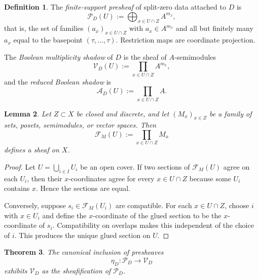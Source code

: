 \documentclass[11pt,a4paper]{article}
\numberwithin{equation}{section}
\newtheorem{theorem}{Theorem}[section]
\newtheorem{lemma}[theorem]{Lemma}
\theoremstyle{definition}
\newtheorem{definition}[theorem]{Definition}
\theoremstyle{remark}
\newcommand{\cP}{\mathcal P}
\newcommand{\cV}{\mathcal V}
\newcommand{\cA}{\mathcal A}
\newcommand{\taup}{\tau}
\begin{document}
\begin{definition}
The \emph{finite-support presheaf} of split-zero data attached to $D$ is
\[
\cP_D(U):=\bigoplus_{x\in U\cap Z}A^{m_x},
\]
that is, the set of families $(a_x)_{x\in U\cap Z}$ with $a_x\in A^{m_x}$ and all but finitely many $a_x$ equal to the basepoint $(\taup,\dots,\taup)$.  Restriction maps are coordinate projection.

The \emph{Boolean multiplicity shadow} of $D$ is the sheaf of $A$-semimodules
\[
\cV_D(U):=\prod_{x\in U\cap Z}A^{m_x},
\]
and the \emph{reduced Boolean shadow} is
\[
\cA_D(U):=\prod_{x\in U\cap Z}A.
\]
\end{definition}

\begin{lemma}\label{lem:product-sheaf}
Let $Z\subset X$ be closed and discrete, and let $(M_x)_{x\in Z}$ be a family of sets, posets, semimodules, or vector spaces.  Then
\[
\mathcal F_M(U):=\prod_{x\in U\cap Z}M_x
\]
defines a sheaf on $X$.
\end{lemma}

\begin{proof}
Let $U=\bigcup_{i\in I}U_i$ be an open cover.  If two sections of $\mathcal F_M(U)$ agree on each $U_i$, then their $x$-coordinates agree for every $x\in U\cap Z$ because some $U_i$ contains $x$.  Hence the sections are equal.

Conversely, suppose $s_i\in\mathcal F_M(U_i)$ are compatible.  For each $x\in U\cap Z$, choose $i$ with $x\in U_i$ and define the $x$-coordinate of the glued section to be the $x$-coordinate of $s_i$.  Compatibility on overlaps makes this independent of the choice of $i$.  This produces the unique glued section on $U$.
\end{proof}

\begin{theorem}\label{thm:sheafification}
The canonical inclusion of presheaves
\[
\eta_D:\cP_D\longrightarrow \cV_D
\]
exhibits $\cV_D$ as the sheafification of $\cP_D$.
\end{theorem}
\end{document}
